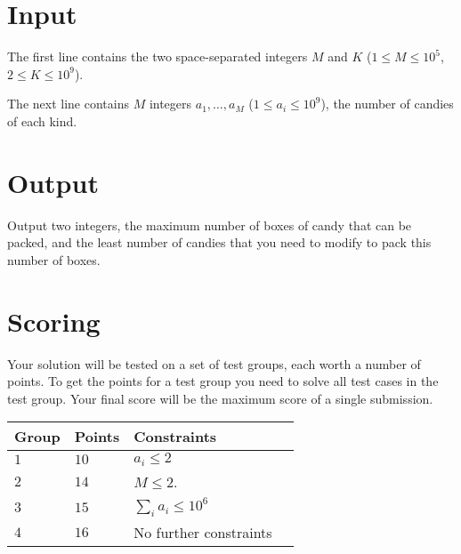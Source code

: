 \section*{Input}
The first line contains the two space-separated integers $M$ and $K$ ($1 \le M \le 10^5$, $2 \le K \le 10^9$).

The next line contains $M$ integers $a_1, \dots, a_M$ ($1 \le a_i \le 10^9$), the number of candies of each kind.

\section*{Output}
Output two integers, the maximum number of boxes of candy that can be packed, and the least number of candies that you need to modify to pack this number of boxes.

\section*{Scoring}
Your solution will be tested on a set of test groups, each worth a number of points.
To get the points for a test group you need to solve all test cases in the test group.
Your final score will be the maximum score of a single submission.

\noindent
\begin{tabular}{| l | l | l | l |}
\hline
Group & Points & Constraints \\ \hline
$1$   & $10$    & $a_i \le 2$ \\ \hline
$2$   & $14$    & $M \le 2$. \\ \hline
$3$   & $15$   & $\sum_i{a_i} \le 10^6$\\ \hline
$4$   & $16$   & No further constraints\\ \hline
\end{tabular}

